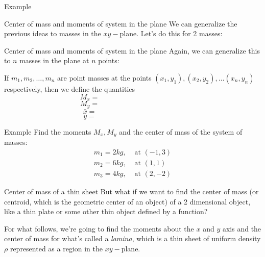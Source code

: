\documentclass[presentation]{beamer}
\begin{document}
\begin{frame}[label={sec:org80b9bab}]{Example}
\end{frame}

\begin{frame}[label={sec:orgcfe5098}]{Center of mass and moments of system in the plane}
We can generalize the previous ideas to masses in the \(xy-\)plane.
Let's do this for 2 masses:
\vspace{10in}
\end{frame}

\begin{frame}[label={sec:orgbf89fb1}]{Center of mass and moments of system in the plane}
Again, we can generalize this to \(n\) masses in the plane at \(n\)
points:
\begin{theorem}
If \(m_1,m_2,\ldots,m_n\) are point masses at the points \(\left(
x_1,y_1 \right), \left( x_2,y_2 \right),\ldots \left( x_n,y_n
\right)\) respectively, then we define the quantities
\[
M_x = \hspace{2in}\]
\[
M_y = \hspace{2in}\]
\[
\bar{x} = \hspace{2in}\]
\[
\bar{y} = \hspace{2in}\]
\end{theorem}

\vspace{10in}
\end{frame}

\begin{frame}[label={sec:orgcfbc57f}]{Example}
Find the moments \(M_x,M_y\) and the center of mass of
the system of masses:
\begin{align*}
m_1 = 2 kg,& \text{ at } \left( -1,3 \right) \\
m_2 = 6 kg,& \text{ at } \left( 1,1 \right) \\
m_3 = 4 kg,& \text{ at } \left( 2,-2 \right)
\end{align*}
\vspace{10in}
\end{frame}

\begin{frame}[label={sec:orga4b23c0}]{Center of mass of a thin sheet}
But what if we want to find the center of mass (or \alert{centroid}, which
is the geometric center of an object) of a 2 dimensional
object, like a thin plate or some other thin object defined by a
function?

For what follows, we're going to find the moments about the \(x\) and
\(y\) axis and the center of mass for what's called a \emph{lamina}, which
is a thin sheet of uniform density \(\rho\) represented as a region
in the \(xy-\)plane. 
\vspace{10in}
\end{frame}
\end{document}
